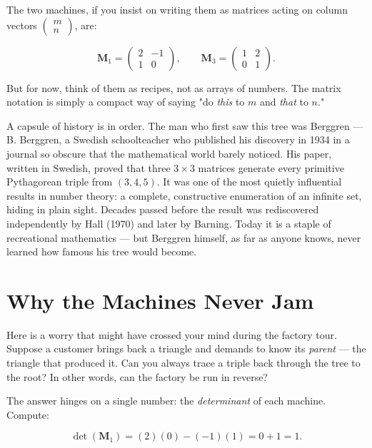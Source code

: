 The two machines, if you insist on writing them as matrices acting on column vectors $\begin{pmatrix} m \\ n \end{pmatrix}$, are:

\[
\mathbf{M}_1 = \begin{pmatrix} 2 & -1 \\ 1 & 0 \end{pmatrix}, \qquad
\mathbf{M}_3 = \begin{pmatrix} 1 & 2 \\ 0 & 1 \end{pmatrix}.
\]

But for now, think of them as recipes, not as arrays of numbers. The matrix notation is simply a compact way of saying "do \textit{this} to $m$ and \textit{that} to $n$."

A capsule of history is in order. The man who first saw this tree was Berggren --- B. Berggren, a Swedish schoolteacher who published his discovery in 1934 in a journal so obscure that the mathematical world barely noticed. His paper, written in Swedish, proved that three $3 \times 3$ matrices generate every primitive Pythagorean triple from $(3, 4, 5)$. It was one of the most quietly influential results in number theory: a complete, constructive enumeration of an infinite set, hiding in plain sight. Decades passed before the result was rediscovered independently by Hall (1970) and later by Barning. Today it is a staple of recreational mathematics --- but Berggren himself, as far as anyone knows, never learned how famous his tree would become.


\ornbreak



\section{Why the Machines Never Jam}


Here is a worry that might have crossed your mind during the factory tour. Suppose a customer brings back a triangle and demands to know its \textit{parent} --- the triangle that produced it. Can you always trace a triple back through the tree to the root? In other words, can the factory be run in reverse?

The answer hinges on a single number: the \textit{determinant} of each machine. Compute:

\[
\det(\mathbf{M}_1) = (2)(0) - (-1)(1) = 0 + 1 = 1.
\]

